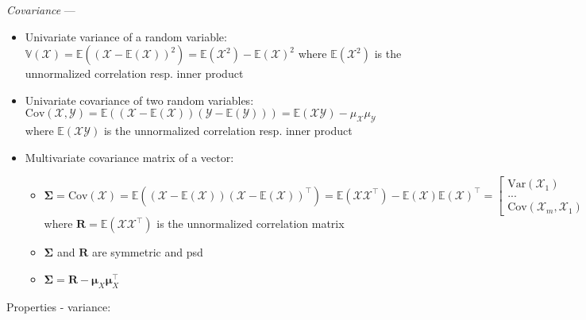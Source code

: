 \emph{Covariance} ---
\begin{itemize}
    \item Univariate variance of a random variable: $\mathbb{V}(\mathcal{X}) = \mathbb{E}((\mathcal{X}-\mathbb{E}(\mathcal{X}))^2) = \mathbb{E}(\mathcal{X}^2) - \mathbb{E}(\mathcal{X})^2$ where $\mathbb{E}(\mathcal{X}^2)$ is the unnormalized correlation resp. inner product
    \item Univariate covariance of two random variables: $\textrm{Cov}(\mathcal{X}, \mathcal{Y}) = \mathbb{E}((\mathcal{X}-\mathbb{E}(\mathcal{X}))(\mathcal{Y}-\mathbb{E}(\mathcal{Y}))) = \mathbb{E}(\mathcal{X}\mathcal{Y}) - \mu_{\mathcal{X}} \mu_{\mathcal{Y}}$ where $\mathbb{E}(\mathcal{X}\mathcal{Y})$ is the unnormalized correlation resp. inner product
    \item Multivariate covariance matrix of a vector: 
    \begin{itemize}
        \item $\boldsymbol{\Sigma} = \textrm{Cov}(\boldsymbol{\mathcal{X}}) = \mathbb{E}((\boldsymbol{\mathcal{X}}-\mathbb{E}(\boldsymbol{\mathcal{X}}))(\boldsymbol{\mathcal{X}}-\mathbb{E}(\boldsymbol{\mathcal{X}}))^\intercal) = \mathbb{E}(\boldsymbol{\mathcal{X}}\boldsymbol{\mathcal{X}}^\intercal) - \mathbb{E}(\boldsymbol{\mathcal{X}})\mathbb{E}(\boldsymbol{\mathcal{X}})^\intercal = \begin{bmatrix}
        \textrm{Var}(\mathcal{X}_1) & ... & \textrm{Cov}(\mathcal{X}_1,\mathcal{X}_m) \\
        ... & ... & ... \\
        \textrm{Cov}(\mathcal{X}_m,\mathcal{X}_1) & ... & \textrm{Var}(\mathcal{X}_m)
        \end{bmatrix}$ where $\boldsymbol{R} = \mathbb{E}(\boldsymbol{\mathcal{X}}\boldsymbol{\mathcal{X}}^\intercal)$ is the unnormalized correlation matrix
        \item $\boldsymbol{\Sigma}$ and $\boldsymbol{R}$ are symmetric and psd
        \item $\boldsymbol{\Sigma} = \boldsymbol{R} - \boldsymbol{\mu}_X \boldsymbol{\mu}_X^\intercal$
    \end{itemize}
\end{itemize}
Properties - variance:
